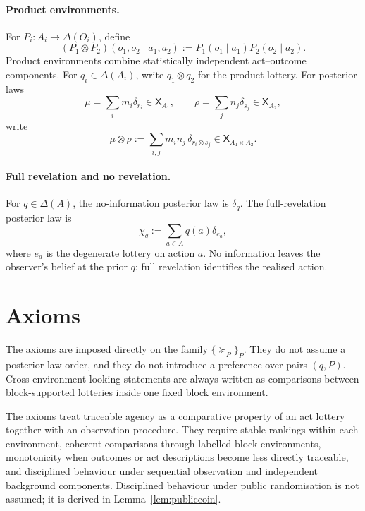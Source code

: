 \documentclass[11pt,a4paper]{article}
\theoremstyle{definition}
\newcommand{\1}{\mathbf 1}
\begin{document}
\paragraph{Product environments.}
For $P_i:A_i\to\Delta(O_i)$, define
\[
(P_1\otimes P_2)(o_1,o_2\mid a_1,a_2)
:=
P_1(o_1\mid a_1)P_2(o_2\mid a_2).
\]
Product environments combine statistically independent act--outcome components.
For $q_i\in\Delta(A_i)$, write $q_1\otimes q_2$ for the product lottery.
For posterior laws
\[
\mu=\sum_i m_i\delta_{r_i}\in\mathsf X_{A_1},
\qquad
\rho=\sum_j n_j\delta_{s_j}\in\mathsf X_{A_2},
\]
write
\[
\mu\otimes\rho
:=
\sum_{i,j}m_i n_j\,\delta_{r_i\otimes s_j}
\in\mathsf X_{A_1\times A_2}.
\]

\paragraph{Full revelation and no revelation.}
For $q\in\Delta(A)$, the no-information posterior law is $\delta_q$.  The full-revelation posterior law is
\[
\chi_q:=\sum_{a\in A}q(a)\delta_{e_a},
\]
where $e_a$ is the degenerate lottery on action $a$.
No information leaves the observer's belief at the prior $q$; full revelation identifies the realised action.

\section*{Axioms}

The axioms are imposed directly on the family $\{\succeq_P\}_P$.  They do not assume a posterior-law order, and they do
not introduce a preference over pairs $(q,P)$.  Cross-environment-looking statements are always written as comparisons
between block-supported lotteries inside one fixed block environment.

The axioms treat traceable agency as a comparative property of an act lottery together with an observation procedure.  They
require stable rankings within each environment, coherent comparisons through labelled block environments, monotonicity
when outcomes or act descriptions become less directly traceable, and disciplined behaviour under
sequential observation and independent background components.  Disciplined behaviour under public randomisation is not
assumed; it is derived in Lemma~\ref{lem:publiccoin}.
\end{document}
